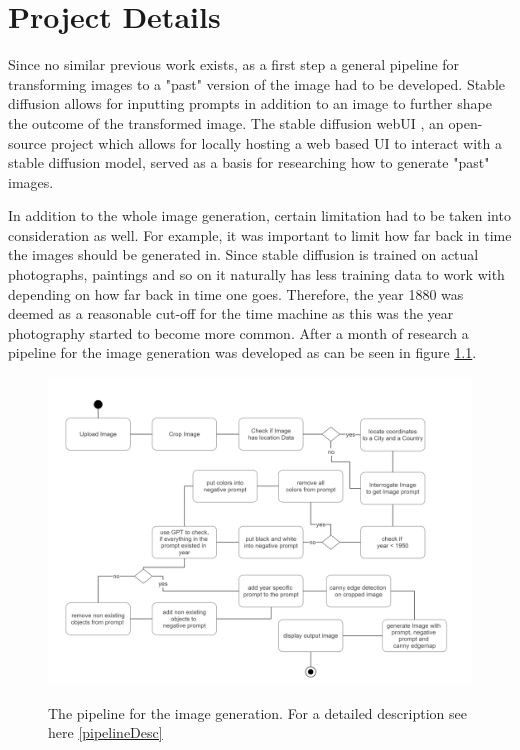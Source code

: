 \documentclass[english,notitlepage,smartquotes]{hgbreport}
\begin{document}
\chapter{Project Details}

Since no similar previous work exists, as a first step a general pipeline for transforming images to a "past" version of the image had to be developed. Stable diffusion allows for inputting prompts in addition to an image to further shape the outcome of the transformed image. The stable diffusion webUI \cite{webui}, an open-source project which allows for locally hosting a web based UI to interact with a stable diffusion model, served as a basis for researching how to generate "past" images.

In addition to the whole image generation, certain limitation had to be taken into consideration as well. For example, it was important to limit how far back in time the images should be generated in. Since stable diffusion is trained on actual photographs, paintings and so on it naturally has less training data to work with depending on how far back in time one goes. Therefore, the year 1880 was deemed as a reasonable cut-off for the time machine as this was the year photography started to become more common. After a month of research a pipeline for the image generation was developed as can be seen in figure \ref{fig:simpPipeline}.

\begin{figure}[htbp]
    \centering\small
    {\includegraphics[width=1\textwidth]{images/pipeline.png}}
    \caption{The pipeline for the image generation. For a detailed description see here \ref{pipelineDesc} }
    \label{fig:simpPipeline}
\end{figure}
\end{document}
